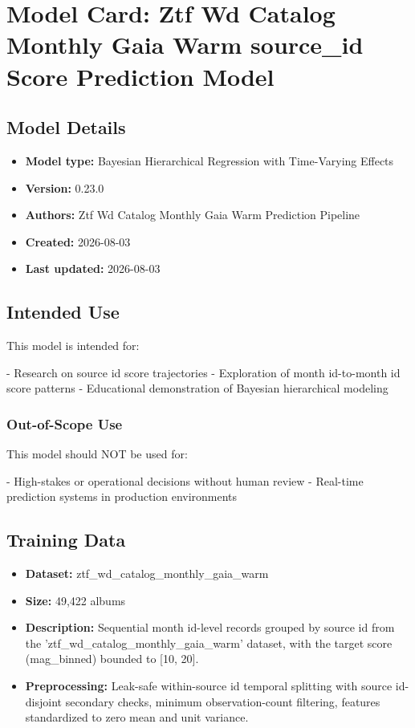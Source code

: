 \documentclass{article}
\begin{document}
\section*{Model Card: Ztf Wd Catalog Monthly Gaia Warm source\_id Score Prediction Model}

\subsection*{Model Details}
\begin{itemize}
  \item \textbf{Model type:} Bayesian Hierarchical Regression with Time-Varying Effects
  \item \textbf{Version:} 0.23.0
  \item \textbf{Authors:} Ztf Wd Catalog Monthly Gaia Warm Prediction Pipeline
  \item \textbf{Created:} 2026-08-03
  \item \textbf{Last updated:} 2026-08-03
\end{itemize}

\subsection*{Intended Use}
This model is intended for:

- Research on source id score trajectories
- Exploration of month id-to-month id score patterns
- Educational demonstration of Bayesian hierarchical modeling

\subsubsection*{Out-of-Scope Use}
This model should NOT be used for:

- High-stakes or operational decisions without human review
- Real-time prediction systems in production environments

\subsection*{Training Data}
\begin{itemize}
  \item \textbf{Dataset:} ztf\_wd\_catalog\_monthly\_gaia\_warm
  \item \textbf{Size:} 49,422 albums
  \item \textbf{Description:} Sequential month id-level records grouped by source id from the 'ztf\_wd\_catalog\_monthly\_gaia\_warm' dataset, with the target score (mag\_binned) bounded to [10, 20].
  \item \textbf{Preprocessing:} Leak-safe within-source id temporal splitting with source id-disjoint secondary checks, minimum observation-count filtering, features standardized to zero mean and unit variance.
\end{itemize}
\end{document}
